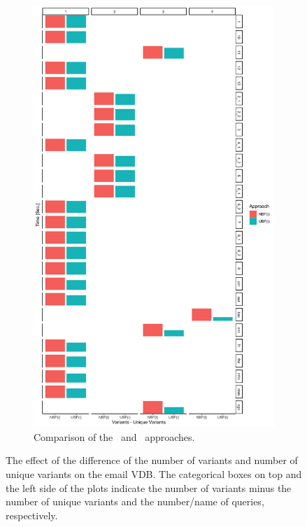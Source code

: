 \begin{figure}[!t]
\begin{subfigure}[t]{0.5\textwidth}
        \includegraphics[scale=0.09]{figs/plots/enron-nbfi-ubfi.png}
        \caption[Comparison of the \nbfi\ and \ubfi\ approaches]{Comparison of the \nbfi\ and \ubfi\ approaches.}
        \label{fig:enron-nbfi-ubfi}
    \end{subfigure}
    \caption[The effect of the difference of the number of variants and number of unique variants on
the email VDB]{The effect of the difference of the number of variants and number of unique 
variants on the email VDB. The categorical boxes on top and the left side of the plots indicate
the number of variants minus the number of unique variants and the number/name of queries, respectively.}
\label{fig:enron-vars-minus}
\end{figure}

